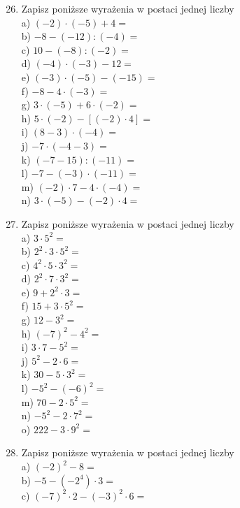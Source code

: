 \documentclass[10pt]{article}
\begin{document}
\begin{enumerate}
  \setcounter{enumi}{25}
  \item Zapisz poniższe wyrażenia w postaci jednej liczby\\
a) \((-2) \cdot(-5)+4=\)\\
b) \(-8-(-12):(-4)=\)\\
c) \(10-(-8):(-2)=\)\\
d) \((-4) \cdot(-3)-12=\)\\
e) \((-3) \cdot(-5)-(-15)=\)\\
f) \(-8-4 \cdot(-3)=\)\\
g) \(3 \cdot(-5)+6 \cdot(-2)=\)\\
h) \(5 \cdot(-2)-[(-2) \cdot 4]=\)\\
i) \((8-3) \cdot(-4)=\)\\
j) \(-7 \cdot(-4-3)=\)\\
k) \((-7-15):(-11)=\)\\
l) \(-7-(-3) \cdot(-11)=\)\\
m) \((-2) \cdot 7-4 \cdot(-4)=\)\\
n) \(3 \cdot(-5)-(-2) \cdot 4=\)
  \item Zapisz poniższe wyrażenia w postaci jednej liczby\\
a) \(3 \cdot 5^{2}=\)\\
b) \(2^{2} \cdot 3 \cdot 5^{2}=\)\\
c) \(4^{2} \cdot 5 \cdot 3^{2}=\)\\
d) \(2^{2} \cdot 7 \cdot 3^{2}=\)\\
e) \(9+2^{2} \cdot 3=\)\\
f) \(15+3 \cdot 5^{2}=\)\\
g) \(12-3^{2}=\)\\
h) \((-7)^{2}-4^{2}=\)\\
i) \(3 \cdot 7-5^{2}=\)\\
j) \(5^{2}-2 \cdot 6=\)\\
k) \(30-5 \cdot 3^{2}=\)\\
l) \(-5^{2}-(-6)^{2}=\)\\
m) \(70-2 \cdot 5^{2}=\)\\
n) \(-5^{2}-2 \cdot 7^{2}=\)\\
o) \(222-3 \cdot 9^{2}=\)
  \item Zapisz poniższe wyrażenia w postaci jednej liczby\\
a) \((-2)^{2}-8=\)\\
b) \(-5-\left(-2^{4}\right) \cdot 3=\)\\
c) \((-7)^{2} \cdot 2-(-3)^{2} \cdot 6=\)\\

\end{enumerate}
\end{document}
